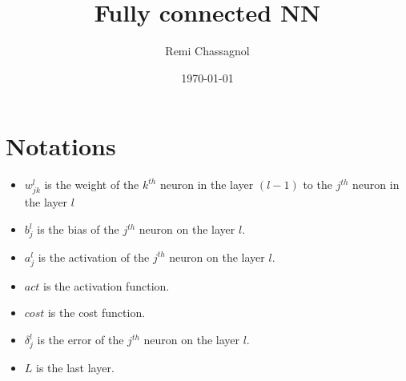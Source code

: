 \documentclass[a4paper]{article}
\title{Fully connected NN}
\author{Remi Chassagnol}
\date{\today}
\begin{document}
\newcommand{\ajl}{a_{j}^{l}}
\newcommand{\ajll}{a_{j}^{l-1}}
\newcommand{\akll}{a_{k}^{l-1}}
\newcommand{\ajL}{a_{j}^{L}}
\newcommand{\akL}{a_{k}^{L}}
\newcommand{\aL}{a^{L}}

\newcommand{\zjl}{z_{j}^{l}}
\newcommand{\zjll}{z_{j}^{l-1}}
\newcommand{\zl}{z^{l}}
\newcommand{\zlp}{z^{l+1}}
\newcommand{\zklp}{z_{k}^{l+1}}
\newcommand{\zjL}{z_{j}^{L}}
\newcommand{\zkL}{z_{k}^{L}}
\newcommand{\zL}{z^{L}}

\newcommand{\wjkl}{w_{jk}^{l}}
\newcommand{\wjkll}{w_{jk}^{l-1}}
\newcommand{\wjklp}{w_{jk}^{l+1}}
\newcommand{\wlp}{w^{l+1}}

\newcommand{\bjl}{b_{j}^{l}}
\newcommand{\bjll}{b_{j}^{l-1}}

\newcommand{\errjl}{\delta_{j}^{l}}
\newcommand{\errjll}{\delta_{j}^{l-1}}
\newcommand{\errl}{\delta^{l}}
\newcommand{\errlp}{\delta^{l+1}}
\newcommand{\errklp}{\delta_{k}^{l+1}}
\newcommand{\errjL}{\delta_{j}^{L}}
\newcommand{\errL}{\delta^{L}}
  
\maketitle

\section{Notations}

\begin{itemize}
  \item $\wjkl$ is the weight of the $k^{th}$ neuron in the layer $(l - 1)$
    to the $j^{th}$ neuron in the layer $l$
  \item $\bjl$ is the bias of the $j^{th}$ neuron on the layer $l$.
  \item $\ajl$ is the activation of the $j^{th}$ neuron on the layer $l$.
  \item $act$ is the activation function.
  \item $cost$ is the cost function.
  \item $\errjl$ is the error of the $j^{th}$ neuron on the layer $l$.
  \item $L$ is the last layer.
\end{itemize}

\begin{center}
\end{center}
\end{document}
